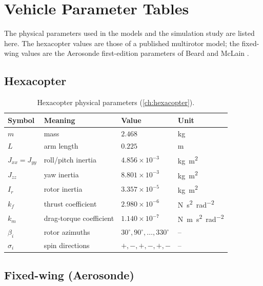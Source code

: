 \chapter{Vehicle Parameter Tables}
\label{app:param}

The physical parameters used in the models and the simulation study are listed
here. The hexacopter values are those of a published multirotor model; the
fixed-wing values are the Aerosonde first-edition parameters of
Beard and McLain \cite{beard2012small}.

\section{Hexacopter}

\begin{table}[h]
\centering
\caption{Hexacopter physical parameters (\cref{ch:hexacopter}).}
\label{tab:hexa-params}
\begin{tabular}{@{}llll@{}}
\toprule
Symbol & Meaning & Value & Unit\\
\midrule
$m$ & mass & $2.468$ & \si{\kilogram}\\
$L$ & arm length & $0.225$ & \si{\meter}\\
$J_{xx}=J_{yy}$ & roll/pitch inertia & $4.856\times10^{-3}$ & \si{\kilogram\meter\squared}\\
$J_{zz}$ & yaw inertia & $8.801\times10^{-3}$ & \si{\kilogram\meter\squared}\\
$I_r$ & rotor inertia & $3.357\times10^{-5}$ & \si{\kilogram\meter\squared}\\
$k_f$ & thrust coefficient & $2.980\times10^{-6}$ & \si{\newton\second\squared\per\radian\squared}\\
$k_m$ & drag-torque coefficient & $1.140\times10^{-7}$ & \si{\newton\meter\second\squared\per\radian\squared}\\
$\beta_i$ & rotor azimuths & $30^\circ,90^\circ,\dots,330^\circ$ & --\\
$\sigma_i$ & spin directions & $+,-,+,-,+,-$ & --\\
\bottomrule
\end{tabular}
\end{table}

\section{Fixed-wing (Aerosonde)}

